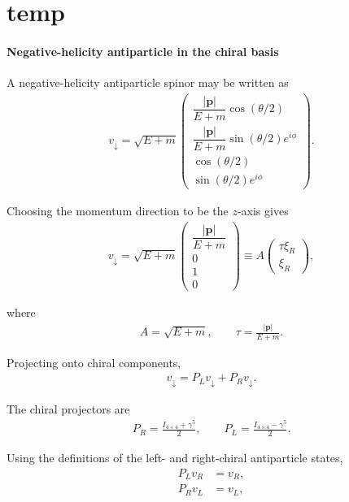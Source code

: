 \section{temp}

\paragraph{Negative-helicity antiparticle in the chiral basis}

A negative-helicity antiparticle spinor may be written as
\begin{align}
v_\downarrow
=
\sqrt{E+m}
\begin{pmatrix}
\dfrac{|\mathbf{p}|}{E+m}\cos(\theta/2) \\
\dfrac{|\mathbf{p}|}{E+m}\sin(\theta/2)e^{i\phi} \\
\cos(\theta/2) \\
\sin(\theta/2)e^{i\phi}
\end{pmatrix}.
\end{align}

Choosing the momentum direction to be the \(z\)-axis gives
\begin{align}
v_\downarrow
=
\sqrt{E+m}
\begin{pmatrix}
\dfrac{|\mathbf{p}|}{E+m} \\
0 \\
1 \\
0
\end{pmatrix}
\equiv
A
\begin{pmatrix}
\tau \xi_R \\
\xi_R
\end{pmatrix},
\end{align}

where
\begin{align}
A = \sqrt{E+m},
\qquad
\tau = \frac{|\mathbf{p}|}{E+m}.
\end{align}

Projecting onto chiral components,
\begin{align}
v_\downarrow = P_L v_\downarrow + P_R v_\downarrow .
\end{align}

The chiral projectors are
\begin{align}
P_R
=
\frac{I_{4\times 4}+\gamma^5}{2},
\qquad
P_L
=
\frac{I_{4\times 4}-\gamma^5}{2}.
\end{align}

Using the definitions of the left- and right-chiral antiparticle states,
\begin{align}
P_L v_R &= v_R, \\
P_R v_L &= v_L ,
\end{align}

